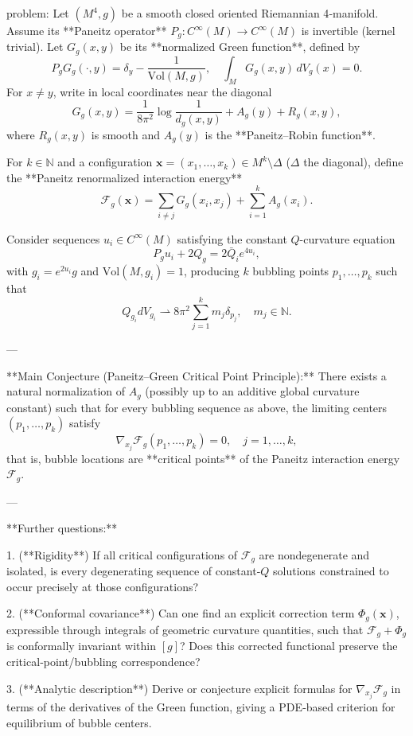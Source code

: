 problem:  
Let \((M^4,g)\) be a smooth closed oriented Riemannian 4‑manifold.  
Assume its **Paneitz operator**
\(P_g: C^\infty(M)\rightarrow C^\infty(M)\) is invertible (kernel trivial).  
Let \(G_g(x,y)\) be its **normalized Green function**, defined by  
\[
P_g G_g(\cdot,y)=\delta_y-\frac{1}{\mathrm{Vol}(M,g)},\quad
\int_M G_g(x,y)\,dV_g(x)=0.
\]
For \(x\neq y\), write in local coordinates near the diagonal
\[
G_g(x,y)=\frac{1}{8\pi^2}\log\frac{1}{d_g(x,y)}+A_g(y)+R_g(x,y),
\]
where \(R_g(x,y)\) is smooth and \(A_g(y)\) is the **Paneitz–Robin function**.

For \(k\in\mathbb N\) and a configuration \(\mathbf{x}=(x_1,\dots,x_k)\in M^k\setminus\Delta\)
(\(\Delta\) the diagonal), define the **Paneitz renormalized interaction energy**
\[
\mathcal F_g(\mathbf{x})
=\sum_{i\neq j} G_g(x_i,x_j) + \sum_{i=1}^k A_g(x_i).
\]

Consider sequences \(u_i\in C^\infty(M)\) satisfying the constant \(Q\)-curvature equation
\[
P_g u_i + 2Q_g = 2\bar Q_i e^{4u_i},
\]
with \(g_i=e^{2u_i}g\) and \(\mathrm{Vol}(M,g_i)=1\), producing \(k\) bubbling points
\(p_1,\ldots,p_k\) such that
\[
Q_{g_i}dV_{g_i}\rightharpoonup 8\pi^2\sum_{j=1}^k m_j\delta_{p_j},\quad m_j\in\mathbb N.
\]

---

**Main Conjecture (Paneitz–Green Critical Point Principle):**  
There exists a natural normalization of \(A_g\) (possibly up to an additive global curvature constant)
such that for every bubbling sequence as above, the limiting centers \((p_1,\dots,p_k)\)
satisfy
\[
\nabla_{x_j}\mathcal F_g(p_1,\dots,p_k)=0, \quad j=1,\dots,k,
\]
that is, bubble locations are **critical points** of the Paneitz interaction energy \(\mathcal F_g\).

---

**Further questions:**

1. (**Rigidity**)  
   If all critical configurations of \(\mathcal F_g\) are nondegenerate and isolated,
   is every degenerating sequence of constant‑\(Q\) solutions constrained
   to occur precisely at those configurations?

2. (**Conformal covariance**)  
   Can one find an explicit correction term \(\Phi_g(\mathbf{x})\), expressible through integrals of geometric curvature quantities, such that \(\mathcal F_g+\Phi_g\) is conformally invariant within \([g]\)?
   Does this corrected functional preserve the critical‑point/bubbling correspondence?

3. (**Analytic description**)  
   Derive or conjecture explicit formulas for \(\nabla_{x_j}\mathcal F_g\)
   in terms of the derivatives of the Green function, 
   giving a PDE‑based criterion for equilibrium of bubble centers.

